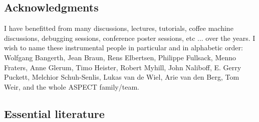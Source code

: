 \documentclass[a4paper]{article}
\begin{document}
\subsection{Acknowledgments} %

I have benefitted from many discussions, lectures, tutorials, coffee machine 
discussions, debugging sessions, conference poster sessions, etc ... 
over the years. I wish to name these instrumental people in particular and 
in alphabetic order: 
Wolfgang Bangerth, 
Jean Braun, 
Rens Elbertsen,
Philippe Fullsack, 
Menno Fraters, 
Anne Glerum,
Timo Heister,
Robert Myhill,
John Naliboff,
E. Gerry Puckett,
Melchior Schuh-Senlis,
Lukas van de Wiel,
Arie van den Berg, 
Tom Weir,
and the whole ASPECT family/team. 



\subsection{Essential literature} %
\end{document}

